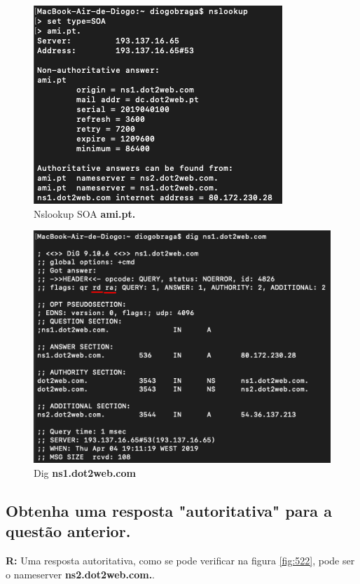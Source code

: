 \documentclass{llncs}
\begin{document}
\begin{figure}[H]
\begin{center}
\includegraphics[scale=0.6]{5.png}
\end{center}
\caption{\label{fig:5}Nslookup SOA \textbf{ami.pt.}}
\end{figure}

\begin{figure}[H]
\begin{center}
\includegraphics[scale=0.6]{5_1.png}
\end{center}
\caption{\label{fig:521}Dig \textbf{ns1.dot2web.com}}
\end{figure}


\newpage

\subsection{\textbf{Obtenha uma resposta "autoritativa" para a questão anterior.}}
\textbf{R:} Uma resposta autoritativa, como se pode verificar na figura \ref{fig:522}, pode ser o nameserver \textbf{ns2.dot2web.com.}.
\end{document}
